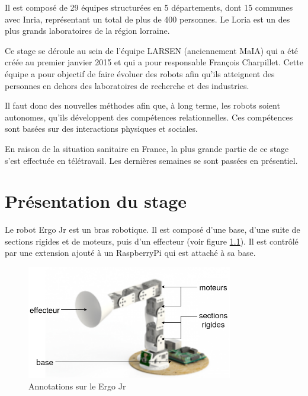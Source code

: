 \documentclass[11pt,french]{report}
\begin{document}
Il est composé de 29 équipes structurées en 5 départements, dont 15 communes avec Inria, représentant un total de plus de 400 personnes.
Le Loria est un des plus grands laboratoires de la région lorraine.

\phantom{INVISIBLE LINE}

Ce stage se déroule au sein de l’équipe LARSEN (anciennement MaIA) qui a été créée au premier janvier 2015 et qui a pour responsable François Charpillet.
Cette équipe a pour objectif de faire évoluer des robots afin qu'ils atteignent des personnes en dehors des laboratoires de recherche et des industries.

Il faut donc des nouvelles méthodes afin que, à long terme, les robots soient autonomes, qu'ils développent des compétences relationnelles.
Ces compétences sont basées sur des interactions physiques et sociales.

\phantom{INVISIBLE LINE}

En raison de la situation sanitaire en France, la plus grande partie de ce stage s'est effectuée en télétravail. Les dernières semaines se sont passées en présentiel.

\chapter{Présentation du stage}

Le robot Ergo Jr est un bras robotique. Il est composé d'une base, d'une suite de sections rigides et de moteurs, puis d'un effecteur (voir figure \ref{fig:SchemaErgoJr}). Il est contrôlé par une extension ajouté à un RaspberryPi qui est attaché à sa base.

\phantom{INVISIBLE LINE}

\begin{figure}[H]
    \centering
    \includegraphics[height=140pt]{Ergo_Diagram} 
    \caption{Annotations sur le Ergo Jr}
    \label{fig:SchemaErgoJr}
\end{figure}
\end{document}
